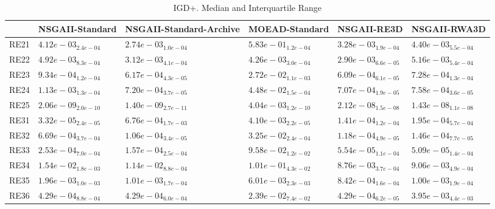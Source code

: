 \documentclass{article}
\begin{document}
\begin{table}
\caption{IGD+. Median and Interquartile Range}
\label{table: IGD+}
\centering
\begin{scriptsize}
\begin{tabular}{llllll}
\hline & NSGAII-Standard & NSGAII-Standard-Archive & MOEAD-Standard & NSGAII-RE3D &  NSGAII-RWA3D\\
\hline 
RE21 & $  4.12e-03_{ 2.4e-04}$ & \cellcolor{gray95}$  2.74e-03_{ 1.0e-04}$ & $  5.83e-01_{ 1.2e-04}$ & \cellcolor{gray25}$  3.28e-03_{ 1.9e-04}$ & $  4.40e-03_{ 5.5e-04}$ \\
RE22 & $  4.92e-03_{ 8.3e-04}$ & \cellcolor{gray25}$  3.12e-03_{ 4.1e-04}$ & $  4.26e-03_{ 3.0e-04}$ & \cellcolor{gray95}$  2.90e-03_{ 6.6e-05}$ & $  5.16e-03_{ 5.4e-04}$ \\
RE23 & $  9.34e-04_{ 1.2e-04}$ & \cellcolor{gray25}$  6.17e-04_{ 4.3e-05}$ & $  2.72e-02_{ 1.1e-03}$ & \cellcolor{gray95}$  6.09e-04_{ 6.1e-05}$ & $  7.28e-04_{ 1.3e-04}$ \\
RE24 & $  1.13e-03_{ 1.3e-04}$ & \cellcolor{gray25}$  7.20e-04_{ 3.7e-05}$ & $  4.48e-02_{ 1.5e-04}$ & \cellcolor{gray95}$  7.07e-04_{ 1.9e-05}$ & $  7.58e-04_{ 3.6e-05}$ \\
RE25 & \cellcolor{gray25}$  2.06e-09_{ 2.0e-10}$ & \cellcolor{gray95}$  1.40e-09_{ 2.7e-11}$ & $  4.04e-03_{ 1.2e-10}$ & $  2.12e-08_{ 1.5e-08}$ & $  1.43e-08_{ 1.1e-08}$ \\
RE31 & \cellcolor{gray95}$  3.32e-05_{ 2.4e-05}$ & $  6.76e-04_{ 1.7e-03}$ & $  4.10e-03_{ 2.2e-05}$ & \cellcolor{gray25}$  1.41e-04_{ 1.2e-04}$ & $  1.95e-04_{ 5.7e-04}$ \\
RE32 & $  6.69e-04_{ 3.7e-04}$ & \cellcolor{gray95}$  1.06e-04_{ 3.4e-05}$ & $  3.25e-02_{ 2.4e-04}$ & \cellcolor{gray25}$  1.18e-04_{ 4.9e-05}$ & $  1.46e-04_{ 7.7e-05}$ \\
RE33 & $  2.53e-04_{ 7.0e-04}$ & $  1.57e-04_{ 2.5e-04}$ & $  9.58e-02_{ 1.2e-02}$ & \cellcolor{gray25}$  5.54e-05_{ 1.1e-04}$ & \cellcolor{gray95}$  5.09e-05_{ 1.4e-04}$ \\
RE34 & $  1.54e-02_{ 1.8e-03}$ & $  1.14e-02_{ 8.8e-04}$ & $  1.01e-01_{ 4.3e-02}$ & \cellcolor{gray95}$  8.76e-03_{ 3.7e-04}$ & \cellcolor{gray25}$  9.06e-03_{ 4.9e-04}$ \\
RE35 & $  1.96e-03_{ 1.0e-03}$ & $  1.01e-03_{ 1.7e-04}$ & $  6.01e-03_{ 2.3e-03}$ & \cellcolor{gray95}$  8.42e-04_{ 1.6e-04}$ & \cellcolor{gray25}$  1.00e-03_{ 1.9e-04}$ \\
RE36 & $  4.29e-04_{ 8.8e-04}$ & \cellcolor{gray25}$  4.29e-04_{ 6.0e-04}$ & $  2.39e-02_{ 7.4e-02}$ & \cellcolor{gray95}$  4.29e-04_{ 6.2e-05}$ & $  3.95e-03_{ 4.4e-03}$ \\

\end{tabular}
\end{scriptsize}
\end{table}
\end{document}
